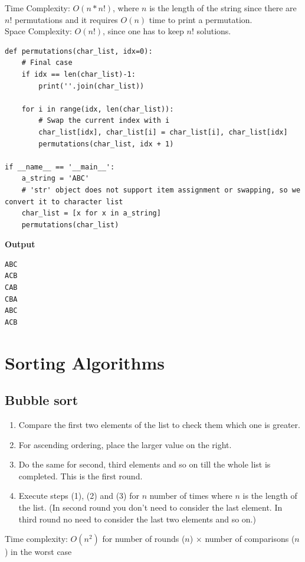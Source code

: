 \documentclass[a4paper,11pt]{book}
\begin{document}
\noindent Time Complexity: $O(n * n!)$, where $n$ is the length of the string since there are $n!$ permutations and it requires $O(n)$ time to print a permutation.\\
Space Complexity: $O(n!)$, since one has to keep $n!$ solutions.

\begin{lstlisting}
def permutations(char_list, idx=0):
    # Final case
    if idx == len(char_list)-1:
        print(''.join(char_list))
 
    for i in range(idx, len(char_list)):
        # Swap the current index with i
        char_list[idx], char_list[i] = char_list[i], char_list[idx]
        permutations(char_list, idx + 1)
 
if __name__ == '__main__':
    a_string = 'ABC'
    # 'str' object does not support item assignment or swapping, so we convert it to character list
    char_list = [x for x in a_string]
    permutations(char_list)
\end{lstlisting}
\textbf{Output}
\begin{lstlisting}
ABC
ACB
CAB
CBA
ABC
ACB
\end{lstlisting}


\chapter{Sorting Algorithms}

\section{Bubble sort}

\begin{enumerate}
	\item Compare the first two elements of the list to check them which one is greater.
	\item For ascending ordering, place the larger value on the right.
	\item Do the same for second, third elements and so on till the whole list is completed. This is the first round.
	\item Execute steps (1), (2) and (3) for $n$ number of times where $n$ is the length of the list. (In second round you don't need to consider the last element. In third round no need to consider the last two elements and so on.)
\end{enumerate}

\noindent Time complexity: $O(n^2)$ for number of rounds ($n$) $\times$ number of comparisons ($n$) in the worst case
\end{document}

